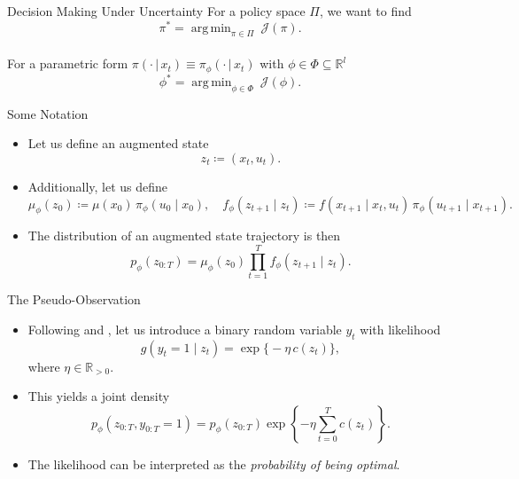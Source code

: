 \documentclass[10pt, aspectratio=1610]{beamer}
\DeclareMathOperator*{\argmin}{arg\,min}
\newcommand{\given}{\,|\,}
\begin{document}
    \begin{frame}{Decision Making Under Uncertainty}
        For a policy space $\Pi$, we want to find
        \begin{equation*}
            \pi^{*} = \argmin_{\pi \in \Pi} \medspace \mathcal{J}(\pi).
        \end{equation*}
        ~ \\
        For a parametric form $\pi(\cdot \given x_t) \equiv \pi_{\phi}(\cdot \given x_t)$ with $\phi \in \Phi \subseteq \mathbb{R}^{l}$
        \begin{equation*}
            \phi^{*} = \argmin_{\phi \in \Phi} \medspace \mathcal{J}(\phi).
        \end{equation*}
    \end{frame}

    \begin{frame}{Some Notation}
      \begin{itemize}[<+->]
        \setlength\itemsep{1.5em}
        \item Let us define an augmented state
          \begin{equation}
            z_t \coloneq (x_t, u_t).
          \end{equation}
        \item Additionally, let us define
          \begin{equation}
            \mu_{\phi}(z_0) \coloneqq \mu(x_0) \, \pi_{\phi}(u_0 \mid x_0), \quad f_{\phi}(z_{t+1} \mid z_t) \coloneqq f(x_{t+1} \mid x_t, u_t) \, \pi_{\phi}(u_{t+1} \mid x_{t+1}).
          \end{equation}
        \item The distribution of an augmented state trajectory is then
          \begin{equation}
            p_\phi(z_{0:T}) = \mu_\phi(z_0) \prod_{t=1}^T f_{\phi}(z_{t+1} \mid z_t).
          \end{equation}
      \end{itemize}
    \end{frame}

    \begin{frame}{The Pseudo-Observation}
      \begin{itemize}[<+->]
        \setlength\itemsep{1.5em}
        \item Following \citet{toussaint2006probabilistic} and \citet{rawlik2013probabilistic}, let us introduce a binary random variable $y_t$ with likelihood
          \begin{equation}
            g(y_t = 1 \mid z_t) = \exp \big\{-\eta \, c(z_t)\big\},
          \end{equation}
          where $\eta \in \mathbb{R}_{>0}$.
        \item This yields a joint density
          \begin{equation}
            p_\phi(z_{0:T}, y_{0:T} = 1) = p_\phi(z_{0:T}) \exp\left\{-\eta \sum_{t=0}^T c(z_t)\right\}.
          \end{equation}
        \item The likelihood can be interpreted as the \emph{probability of being optimal}.
      \end{itemize}
    \end{frame}
\end{document}
